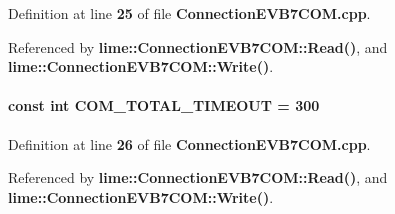 Definition at line {\bf 25} of file {\bf Connection\+E\+V\+B7\+C\+O\+M.\+cpp}.



Referenced by {\bf lime\+::\+Connection\+E\+V\+B7\+C\+O\+M\+::\+Read()}, and {\bf lime\+::\+Connection\+E\+V\+B7\+C\+O\+M\+::\+Write()}.

\paragraph[{C\+O\+M\+\_\+\+T\+O\+T\+A\+L\+\_\+\+T\+I\+M\+E\+O\+UT}]{\setlength{\rightskip}{0pt plus 5cm}const {\bf int} C\+O\+M\+\_\+\+T\+O\+T\+A\+L\+\_\+\+T\+I\+M\+E\+O\+UT = 300\hspace{0.3cm}{\ttfamily [static]}}\label{ConnectionEVB7COM_8cpp_aa7202e4a12eef4ac1169719bc42f19b6}


Definition at line {\bf 26} of file {\bf Connection\+E\+V\+B7\+C\+O\+M.\+cpp}.



Referenced by {\bf lime\+::\+Connection\+E\+V\+B7\+C\+O\+M\+::\+Read()}, and {\bf lime\+::\+Connection\+E\+V\+B7\+C\+O\+M\+::\+Write()}.


